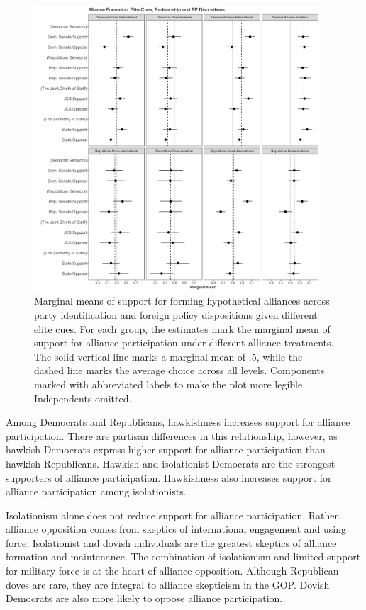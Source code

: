 \documentclass[12pt]{article}
\begin{document}
\begin{figure}[htpb]
	\centering
		\includegraphics[width=0.95\textwidth]{../figures/party-dispo-form-el.png}
	\caption{Marginal means of support for forming hypothetical alliances across party identification and foreign policy dispositions given different elite cues. For each group, the estimates mark the marginal mean of support for alliance participation under different alliance treatments. The solid vertical line marks a marginal mean of .5, while the dashed line marks the average choice across all levels. Components marked with abbreviated labels to make the plot more legible. Independents omitted.}
	\label{fig:party-dispo-form-el}
\end{figure}


Among Democrats and Republicans, hawkishness increases support for alliance participation. 
There are partisan differences in this relationship, however, as hawkish Democrats express higher support for alliance participation than hawkish Republicans. 
Hawkish and isolationist Democrats are the strongest supporters of alliance participation. 
Hawkishness also increases support for alliance participation among isolationists. 


Isolationism alone does not reduce support for alliance participation.
Rather, alliance opposition comes from skeptics of international engagement and using force. 
Isolationist and dovish individuals are the greatest skeptics of alliance formation and maintenance. 
The combination of isolationism and limited support for military force is at the heart of alliance opposition. 
Although Republican doves are rare, they are integral to alliance skepticism in the GOP. 
Dovish Democrats are also more likely to oppose alliance participation.  
\end{document}
